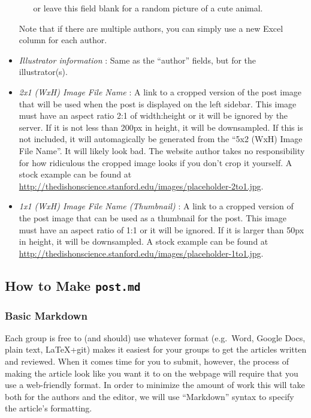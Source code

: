 \documentclass[paper=a4, fontsize=11pt]{scrartcl}
\numberwithin{equation}{section}        %
\numberwithin{figure}{section}            %
\numberwithin{table}{section}                %
\newcommand{\dishurlplain}[1]{http://thedishonscience.stanford.edu/#1}
\newcommand{\dishurl}[1]{\url{\dishurlplain{#1}}}
\begin{document}
\begin{itemize}
\begin{itemize}
\begin{itemize}
                \end{itemize}
                or leave this field blank for a random picture of a
                cute animal.
        \end{itemize}
        Note that if there are multiple authors, you can simply use a new Excel
        column for each author.
    \item \emph{Illustrator information} : Same as
        the ``author'' fields, but for the illustrator(s).
    \item \emph{2x1 (WxH) Image File Name} : A link to a cropped version of the post image that
        will be used when the post is displayed on the left sidebar. This image
        must have an aspect ratio 2:1 of width:height or it will be ignored by
        the server. If it is not less than
        200px in height, it will be downsampled. If this is not included, it
        will automagically be generated from the ``5x2 (WxH) Image File Name''.
        It will likely look bad. The website author takes no responsibility for
        how ridiculous the cropped image looks if you don't crop it yourself. A stock
        example can be found at
        \dishurl{images/placeholder-2to1.jpg}.
    \item \emph{1x1 (WxH) Image File Name (Thumbnail)} : A link to a cropped version of the post image
        that can be used as a thumbnail for the post. This image must have an
        aspect ratio of 1:1 or it will be ignored. If it is larger than 50px in
        height, it will be downsampled. A stock
        example can be found at
        \dishurl{images/placeholder-1to1.jpg}.

\end{itemize}

\subsection{How to Make \texttt{\textbf{post.md}}}\label{sec:markdown}

\subsubsection{Basic Markdown}

Each group is free to (and should) use whatever format (e.g.\ Word, Google Docs, plain text,
LaTeX+git) makes it easiest for your groups to get the articles written and
reviewed. When it comes time for you to submit, however, the process of making
the article look like you want it to on the webpage will require that you use a web-friendly
format. In order to minimize the amount of work this will take both for the
authors and the editor, we will use ``Markdown'' syntax to specify the article's
formatting.
\end{document}
